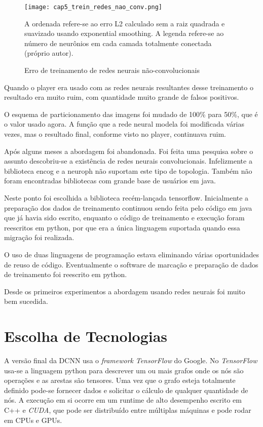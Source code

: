 \begin{figure}[!htb]
	\centering
	\texttt{[image: cap5\_trein\_redes\_nao\_conv.png]}
	\caption{Erro de treinamento de redes neurais não-convolucionais}
	\label{fig:cap5_trein_redes_nao_conv}
	A ordenada refere-se ao erro L2 calculado sem a raiz quadrada e suavizado
	usando exponential smoothing. A legenda refere-se ao número de neurônios
	em cada camada totalmente conectada (próprio autor).
\end{figure}


Quando o player era usado com as redes neurais resultantes desse treinamento o
resultado era muito ruim, com quantidade muito grande de falsos positivos.

O esquema de particionamento das imagens foi mudado de 100\% para 50\%, que é o
valor usado agora. A função que a rede neural modela foi modificada
várias vezes, mas
o resultado final, conforme visto no player, continuava ruim.

Após alguns meses a abordagem foi abandonada. Foi feita uma pesquisa sobre o
assunto descobriu-se a existência de redes neurais convolucionais. Infelizmente
a biblioteca encog e a neuroph não suportam este tipo de topologia. Também não
foram encontradas bibliotecas com grande base de usuários em java.

Neste ponto foi escolhida a biblioteca recém-lançada tensorflow. Inicialmente a
preparação dos dados de treinamento continuou sendo feita pelo código em java
que já havia sido escrito, enquanto o código de treinamento e execução foram
reescritos em python, por que era a única linguagem suportada quando essa
migração foi realizada.

O uso de duas linguagens de programação estava eliminando várias oportunidades
de reuso de código. Eventualmente o software de marcação e preparação de dados
de treinamento foi reescrito em python.

Desde os primeiros experimentos a abordagem usando redes neurais foi muito bem
sucedida.

\section{Escolha de Tecnologias}
A versão final da DCNN usa o \emph{framework} \emph{TensorFlow} do Google.
No \emph{TensorFlow} usa-se a linguagem python para descrever um ou mais
grafos onde
os nós são operações e as arestas são tensores. Uma vez que o grafo esteja
totalmente definido pode-se fornecer dados e solicitar o cálculo de qualquer
quantidade de nós. A execução em si ocorre em um runtime de alto desempenho
escrito em C++ e \emph{CUDA}, que pode ser distribuído entre múltiplas
máquinas e pode rodar em CPUs e GPUs.

